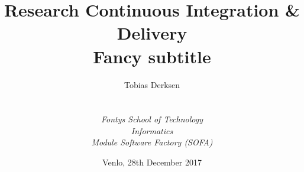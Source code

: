 
\def\Company{Fontys Sofa Group 1}
\def\Institute{\textit{Fontys School of Technology}}
\def\Course{\textit{Informatics}}
\def\Module{\textit{Module Software Factory (SOFA)}}

\def\BoldTitle{Research Continuous Integration \& Delivery}
\def\Subtitle{Fancy subtitle}
\def\Authors{Tobias Derksen}


\title{\textbf{\BoldTitle}\\\Subtitle}
\author{\Authors \\ \\ \\ \Institute\\ \Course\\ \Module}
\date{Venlo, 28th December 2017}
